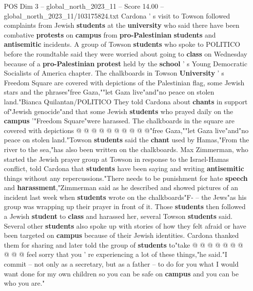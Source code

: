 \begin{textsample}{POS Dim 3 – global\_north\_2023\_11 – Score 14.00 – global\_north\_2023\_11/103175824.txt}
Cardona ' s visit to Towson followed complaints from Jewish \textbf{students} at the \textbf{university} who said there have been combative \textbf{protests} on \textbf{campus} from \textbf{pro-Palestinian} \textbf{students} and \textbf{antisemitic} incidents.
A group of Towson \textbf{students} who spoke to POLITICO before the roundtable said they were worried about going to \textbf{class} on Wednesday because of a \textbf{pro-Palestinian} \textbf{protest} held by the \textbf{school} ' s Young Democratic Socialists of America chapter.
The chalkboards in Towson \textbf{University} ' s Freedom Square are covered with depictions of the Palestinian flag, some Jewish stars and the phrases"free Gaza,""let Gaza live"and"no peace on stolen land."Bianca Quilantan/POLITICO They told Cardona about \textbf{chants} in support of"Jewish genocide"and that some Jewish \textbf{students} who prayed daily on the \textbf{campus} '"Freedom Square"were harassed.
The chalkboards in the square are covered with depictions @ @ @ @ @ @ @ @ @ @"free Gaza,""let Gaza live"and"no peace on stolen land."Towson \textbf{students} said the \textbf{chant} used by Hamas,"From the river to the sea,"has also been written on the chalkboards.
Max Zimmerman, who started the Jewish prayer group at Towson in response to the Israel-Hamas conflict, told Cardona that \textbf{students} have been saying and writing \textbf{antisemitic} things without any repercussions."There needs to be punishment for hate \textbf{speech} and \textbf{harassment},"Zimmerman said as he described and showed pictures of an incident last week when \textbf{students} wrote on the chalkboards"F- -- the Jews"as his group was wrapping up their prayer in front of it.
Those \textbf{students} then followed a Jewish \textbf{student} to \textbf{class} and harassed her, several Towson \textbf{students} said.
Several other \textbf{students} also spoke up with stories of how they felt afraid or have been targeted on \textbf{campus} because of their Jewish identities.
Cardona thanked them for sharing and later told the group of \textbf{students} to"take @ @ @ @ @ @ @ @ @ @ feel sorry that you ' re experiencing a lot of these things,"he said."I commit -- not only as a secretary, but as a father -- to do for you what I would want done for my own children so you can be safe on \textbf{campus} and you can be who you are."

\end{textsample}
